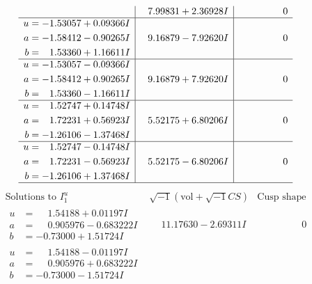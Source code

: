 \documentclass[1p]{elsarticle_modified}
\theoremstyle{definition}
\newcommand{\I}{\sqrt{-1}}
\begin{document}
$$\begin{array}{c|c|c}
 & \phantom{-}7.99831 + 2.36928 I & \phantom{-0.000000 } 0 \\ \hline\begin{aligned}
u &= -1.53057 + 0.09366 I \\
a &= -1.58412 - 0.90265 I \\
b &= \phantom{-}1.53360 + 1.16611 I\end{aligned}
 & \phantom{-}9.16879 - 7.92620 I & \phantom{-0.000000 } 0 \\ \hline\begin{aligned}
u &= -1.53057 - 0.09366 I \\
a &= -1.58412 + 0.90265 I \\
b &= \phantom{-}1.53360 - 1.16611 I\end{aligned}
 & \phantom{-}9.16879 + 7.92620 I & \phantom{-0.000000 } 0 \\ \hline\begin{aligned}
u &= \phantom{-}1.52747 + 0.14748 I \\
a &= \phantom{-}1.72231 + 0.56923 I \\
b &= -1.26106 - 1.37468 I\end{aligned}
 & \phantom{-}5.52175 + 6.80206 I & \phantom{-0.000000 } 0 \\ \hline\begin{aligned}
u &= \phantom{-}1.52747 - 0.14748 I \\
a &= \phantom{-}1.72231 - 0.56923 I \\
b &= -1.26106 + 1.37468 I\end{aligned}
 & \phantom{-}5.52175 - 6.80206 I & \phantom{-0.000000 } 0\\
 \hline 
 \end{array}$$\newpage$$\begin{array}{c|c|c}  
\text{Solutions to }I^u_{1}& \I (\text{vol} + \sqrt{-1}CS) & \text{Cusp shape}\\
 \hline 
\begin{aligned}
u &= \phantom{-}1.54188 + 0.01197 I \\
a &= \phantom{-}0.905976 - 0.683222 I \\
b &= -0.73000 + 1.51724 I\end{aligned}
 & \phantom{-}11.17630 - 2.69311 I & \phantom{-0.000000 } 0 \\ \hline\begin{aligned}
u &= \phantom{-}1.54188 - 0.01197 I \\
a &= \phantom{-}0.905976 + 0.683222 I \\
b &= -0.73000 - 1.51724 I\end{aligned}

\end{array}$$
\end{document}
